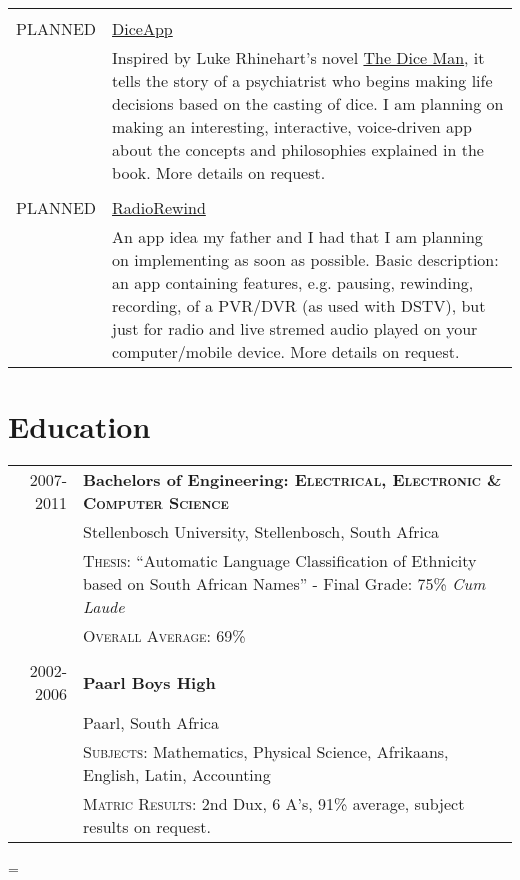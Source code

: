 \documentclass[a4paper,10pt,notitlepage]{article}
\newenvironment{absolutelynopagebreak}
  {\par\nobreak\vfil\penalty0\vfilneg
   \vtop\bgroup}
  {\par\xdef\tpd{\the\prevdepth}\egroup
   \prevdepth=\tpd}
\begin{document}
\begin{absolutelynopagebreak}
\begin{tabular}{r|p{11cm}}
\multicolumn{2}{c}{}\\
\textsc{PLANNED} &
\href{www.laurcode.com}{DiceApp}\\&\footnotesize{Inspired by Luke Rhinehart’s novel \href{https://en.wikipedia.org/wiki/The_Dice_Man}{The Dice Man}, it tells the story of a psychiatrist who begins making life decisions based on the casting of dice. I am planning on making an interesting, interactive, voice-driven app about the concepts and philosophies explained in the book. More details on request.} \\

\multicolumn{2}{c}{}\\
\textsc{PLANNED} &
\href{www.laurcode.com}{RadioRewind}\\&\footnotesize{An app idea my father and I had that I am planning on implementing as soon as possible. Basic description: an app containing features, e.g. pausing, rewinding, recording, of a PVR/DVR (as used with DSTV), but just for radio and live stremed audio played on your computer/mobile device. More details on request.} \\

\end{tabular}

\section{Education}
\begin{tabular}{r|p{11cm}}

 \textsc{2007-2011} & \textbf{Bachelors of Engineering: \textsc{Electrical, Electronic \& Computer Science}} \\
& Stellenbosch University, Stellenbosch, South Africa \\
& \textsc{Thesis}: ``Automatic Language Classification of Ethnicity based on South African Names'' - \small Final Grade: 75\% \textit{Cum Laude} \\
&\normalsize \textsc{Overall Average}: 69\% \\

\multicolumn{2}{c}{}\\

\textsc{2002-2006} & \textbf{Paarl Boys High} \\ & \normalsize Paarl, South Africa \\
&\textsc{Subjects}: Mathematics, Physical Science, Afrikaans, English, Latin, Accounting \\
&\normalsize \textsc{Matric Results}: 2nd Dux, 6 A's, 91\% average, subject results on request. \\


\end{tabular}
\end{absolutelynopagebreak}
\end{document}
